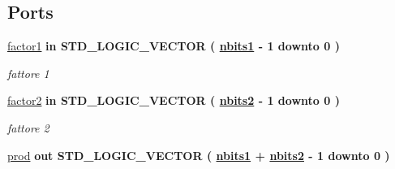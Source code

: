 \subsection*{Ports}
 \begin{DoxyCompactItemize}
\item 
\hyperlink{group___multiplier_gac728adecdbfe10213256c17c1b5c5128}{factor1}  {\bfseries {\bfseries \textcolor{vhdlchar}{in}\textcolor{vhdlchar}{ }}} {\bfseries \textcolor{vhdlchar}{S\+T\+D\+\_\+\+L\+O\+G\+I\+C\+\_\+\+V\+E\+C\+T\+OR}\textcolor{vhdlchar}{ }\textcolor{vhdlchar}{(}\textcolor{vhdlchar}{ }\textcolor{vhdlchar}{ }\textcolor{vhdlchar}{ }\textcolor{vhdlchar}{ }{\bfseries \hyperlink{group___multiplier_ga4ede473cdc13e75fe66fbd548b62e432}{nbits1}} \textcolor{vhdlchar}{-\/}\textcolor{vhdlchar}{ } \textcolor{vhdldigit}{1} \textcolor{vhdlchar}{ }\textcolor{vhdlchar}{downto}\textcolor{vhdlchar}{ }\textcolor{vhdlchar}{ } \textcolor{vhdldigit}{0} \textcolor{vhdlchar}{ }\textcolor{vhdlchar}{)}\textcolor{vhdlchar}{ }} 
\begin{DoxyCompactList}\small\item\em fattore 1 \end{DoxyCompactList}\item 
\hyperlink{group___multiplier_gac140852334303b430bbd49689cc689dd}{factor2}  {\bfseries {\bfseries \textcolor{vhdlchar}{in}\textcolor{vhdlchar}{ }}} {\bfseries \textcolor{vhdlchar}{S\+T\+D\+\_\+\+L\+O\+G\+I\+C\+\_\+\+V\+E\+C\+T\+OR}\textcolor{vhdlchar}{ }\textcolor{vhdlchar}{(}\textcolor{vhdlchar}{ }\textcolor{vhdlchar}{ }\textcolor{vhdlchar}{ }\textcolor{vhdlchar}{ }{\bfseries \hyperlink{group___multiplier_ga8b5bdaff4c3669528aaec95a07e17c2a}{nbits2}} \textcolor{vhdlchar}{-\/}\textcolor{vhdlchar}{ } \textcolor{vhdldigit}{1} \textcolor{vhdlchar}{ }\textcolor{vhdlchar}{downto}\textcolor{vhdlchar}{ }\textcolor{vhdlchar}{ } \textcolor{vhdldigit}{0} \textcolor{vhdlchar}{ }\textcolor{vhdlchar}{)}\textcolor{vhdlchar}{ }} 
\begin{DoxyCompactList}\small\item\em fattore 2 \end{DoxyCompactList}\item 
\hyperlink{group___multiplier_gaf168dc69ad77dc5791b5e0f99dcfb0a9}{prod}  {\bfseries {\bfseries \textcolor{vhdlchar}{out}\textcolor{vhdlchar}{ }}} {\bfseries \textcolor{vhdlchar}{S\+T\+D\+\_\+\+L\+O\+G\+I\+C\+\_\+\+V\+E\+C\+T\+OR}\textcolor{vhdlchar}{ }\textcolor{vhdlchar}{(}\textcolor{vhdlchar}{ }\textcolor{vhdlchar}{ }\textcolor{vhdlchar}{ }\textcolor{vhdlchar}{ }{\bfseries \hyperlink{group___multiplier_ga4ede473cdc13e75fe66fbd548b62e432}{nbits1}} \textcolor{vhdlchar}{+}\textcolor{vhdlchar}{ }\textcolor{vhdlchar}{ }\textcolor{vhdlchar}{ }{\bfseries \hyperlink{group___multiplier_ga8b5bdaff4c3669528aaec95a07e17c2a}{nbits2}} \textcolor{vhdlchar}{-\/}\textcolor{vhdlchar}{ } \textcolor{vhdldigit}{1} \textcolor{vhdlchar}{ }\textcolor{vhdlchar}{downto}\textcolor{vhdlchar}{ }\textcolor{vhdlchar}{ } \textcolor{vhdldigit}{0} \textcolor{vhdlchar}{ }\textcolor{vhdlchar}{)}\textcolor{vhdlchar}{ }} 

\end{DoxyCompactItemize}
